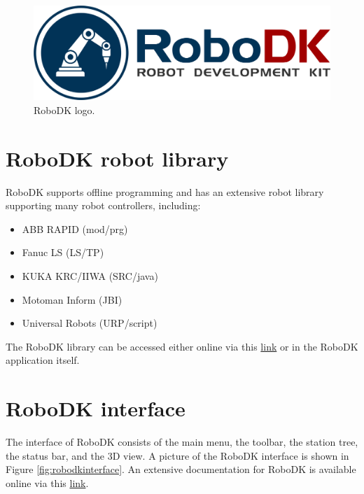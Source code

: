 \begin{figure}[h]
    \centering
    \includegraphics[width=0.6\linewidth]{img/robodk_logo.png}
    \caption{RoboDK logo.}
    \label{fig:robodklogo}
\end{figure}

\section{RoboDK robot library}

RoboDK supports offline programming and has an extensive robot library supporting many robot controllers, including:

\begin{itemize}
    \item ABB RAPID (mod/prg)
    \item Fanuc LS (LS/TP)
    \item KUKA KRC/IIWA (SRC/java)
    \item Motoman Inform (JBI)
    \item Universal Robots (URP/script)
\end{itemize}

The RoboDK library can be accessed either online via this \href{https://en.etsmtl.ca/unites-de-recherche/coro/accueil?lang=en-CA}{link}  or in the RoboDK application itself. 



\section{RoboDK interface}

The interface of RoboDK consists of the main menu, the toolbar, the station tree, the status bar, and the 3D view. A picture of the RoboDK interface is shown in Figure \ref{fig:robodkinterface}. An extensive documentation for RoboDK is available online via this \href{https://robodk.com/doc/en/Basic-Guide.html#Start}{link}.

